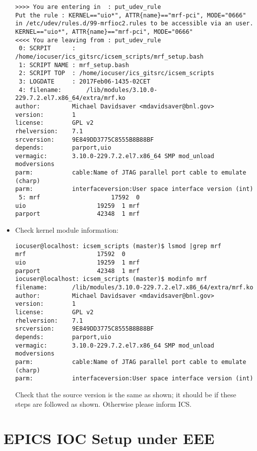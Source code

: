 \documentclass[11pt
  , a4paper
  , article
  , oneside
  , showtrims
]{memoir}
\begin{document}
\begin{itemize}
\begin{lstlisting}[style=termstyle]
>>>> You are entering in  : put_udev_rule
Put the rule : KERNEL=="uio*", ATTR{name}=="mrf-pci", MODE="0666" in /etc/udev/rules.d/99-mrfioc2.rules to be accessible via an user.
KERNEL=="uio*", ATTR{name}=="mrf-pci", MODE="0666"
<<<< You are leaving from : put_udev_rule
 0: SCRPIT      : /home/iocuser/ics_gitsrc/icsem_scripts/mrf_setup.bash
 1: SCRIPT NAME : mrf_setup.bash
 2: SCRIPT TOP  : /home/iocuser/ics_gitsrc/icsem_scripts
 3: LOGDATE     : 2017Feb06-1435-02CET
 4: filename:       /lib/modules/3.10.0-229.7.2.el7.x86_64/extra/mrf.ko
author:         Michael Davidsaver <mdavidsaver@bnl.gov>
version:        1
license:        GPL v2
rhelversion:    7.1
srcversion:     9E849DD3775C8555B8B88BF
depends:        parport,uio
vermagic:       3.10.0-229.7.2.el7.x86_64 SMP mod_unload modversions 
parm:           cable:Name of JTAG parallel port cable to emulate (charp)
parm:           interfaceversion:User space interface version (int)
 5: mrf                    17592  0 
uio                    19259  1 mrf
parport                42348  1 mrf
\end{lstlisting}
\item Check kernel module information:
\begin{lstlisting}[style=termstyle]
iocuser@localhost: icsem_scripts (master)$ lsmod |grep mrf
mrf                    17592  0 
uio                    19259  1 mrf
parport                42348  1 mrf
iocuser@localhost: icsem_scripts (master)$ modinfo mrf
filename:       /lib/modules/3.10.0-229.7.2.el7.x86_64/extra/mrf.ko
author:         Michael Davidsaver <mdavidsaver@bnl.gov>
version:        1
license:        GPL v2
rhelversion:    7.1
srcversion:     9E849DD3775C8555B8B88BF
depends:        parport,uio
vermagic:       3.10.0-229.7.2.el7.x86_64 SMP mod_unload modversions 
parm:           cable:Name of JTAG parallel port cable to emulate (charp)
parm:           interfaceversion:User space interface version (int)
\end{lstlisting}
Check that the source version is the same as shown; it should be if these steps are followed as shown. Otherwise please inform ICS.
\end{itemize}






\clearpage
\section{EPICS IOC Setup under EEE}
\end{document}
